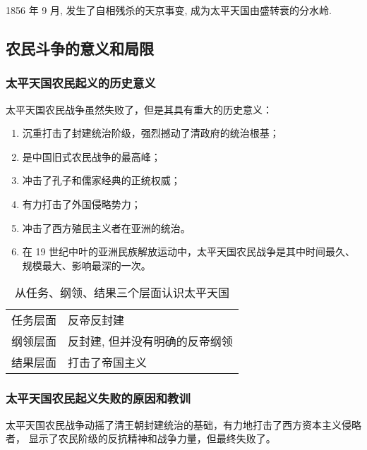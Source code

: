 \documentclass[10pt, UTF8]{ctexbook} %
\begin{document}
1856 年 9 月, 发生了自相残杀的天京事变, 成为太平天国由盛转衰的分水岭.

\subsection{农民斗争的意义和局限}

\subsubsection{太平天国农民起义的历史意义}

太平天国农民战争虽然失败了，但是其具有重大的历史意义：
\begin{enumerate}[label=(\arabic*), itemsep=0pt]
    \item 沉重打击了封建统治阶级，强烈撼动了清政府的统治根基；
    \item 是中国旧式农民战争的最高峰；
    \item 冲击了孔子和儒家经典的正统权威；
    \item 有力打击了外国侵略势力；
    \item 冲击了西方殖民主义者在亚洲的统治。
    \item 在 19 世纪中叶的亚洲民族解放运动中，太平天国农民战争是其中时间最久、
    规模最大、影响最深的一次。
\end{enumerate}

\begin{table}[H]
    \centering
    \caption{从任务、纲领、结果三个层面认识太平天国}
    \begin{tabular}{c|p{}}
        任务层面 & 反帝反封建 \\ 
        纲领层面 & 反封建, 但并没有明确的反帝纲领 \\ 
        结果层面 & 打击了帝国主义
    \end{tabular}
\end{table}

\subsubsection{太平天国农民起义失败的原因和教训}

太平天国农民战争动摇了清王朝封建统治的基础，有力地打击了西方资本主义侵略者，
显示了农民阶级的反抗精神和战争力量，但最终失败了。
\end{document}
